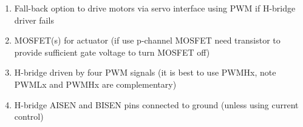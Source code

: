 \documentclass[a4paper, 12pt]{article}
\begin{document}
\begin{enumerate}
\item Fall-back option to drive motors via servo interface using PWM
  if H-bridge driver fails

\item MOSFET(s) for actuator (if use p-channel MOSFET need transistor
  to provide sufficient gate voltage to turn MOSFET off)

\item H-bridge driven by four PWM signals (it is best to use PWMHx,
  note PWMLx and PWMHx are complementary)

\item H-bridge AISEN and BISEN pins connected to ground (unless using
  current control)

\end{enumerate}
\end{document}
